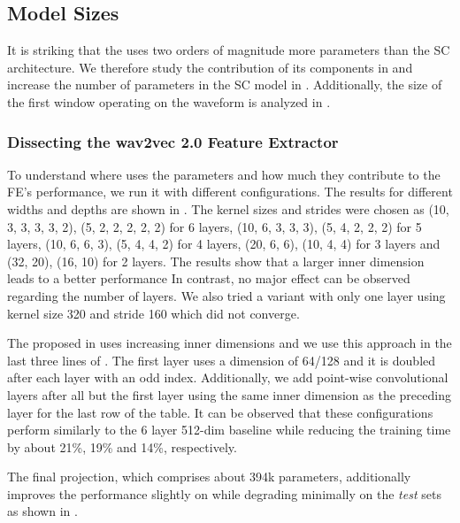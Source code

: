 \documentclass{INTERSPEECH2023}
\begin{document}
\subsection{Model Sizes}
It is striking that the \wvtwo \fe uses two orders of magnitude more parameters than the \gls{SC} architecture.
We therefore study the contribution of its components in  and increase the number of parameters in the \gls{SC} model in .
Additionally, the size of the first window operating on the waveform is analyzed in .

\subsubsection{Dissecting the wav2vec 2.0 Feature Extractor}
\label{sec:w2v_components}
To understand where \wvtwo uses the parameters and how much they contribute to the \gls{FE}'s performance, we run it with different configurations.
The results for different widths and depths are shown in .
The kernel sizes and strides were chosen as (10, 3, 3, 3, 3, 2), (5, 2, 2, 2, 2, 2) for 6 layers, (10, 6, 3, 3, 3), (5, 4, 2, 2, 2) for 5 layers, (10, 6, 6, 3), (5, 4, 4, 2) for 4 layers, (20, 6, 6), (10, 4, 4) for 3 layers and (32, 20), (16, 10) for 2 layers.
The results show that a larger inner dimension leads to a better performance
In contrast, no major effect can be observed regarding the number of layers.
We also tried a variant with only one layer using kernel size 320 and stride 160 which did not converge.

The proposed \fe in \cite{asapp2022performance} uses increasing inner dimensions and we use this approach in the last three lines of .
The first layer uses a dimension of 64/128 and it is doubled after each layer with an odd index.
Additionally, we add point-wise convolutional layers after all but the first layer using the same inner dimension as the preceding layer for the last row of the table.
It can be observed that these configurations perform similarly to the 6 layer 512-dim baseline while reducing the training time by about 21\%, 19\% and 14\%, respectively.

The final projection, which comprises about 394k parameters, additionally improves the performance slightly on \devother while degrading minimally on the \textit{test} sets as shown in .



\end{document}
